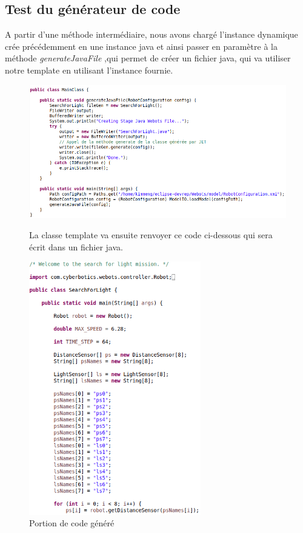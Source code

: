 \documentclass[a4paper,12pt]{article}
\begin{document}
\subsection{Test du générateur de code}
A partir d'une méthode intermédiaire, nous avons chargé l'instance dynamique crée précédemment en une instance java et ainsi passer en paramètre à la méthode \textit{generateJavaFile} 
,qui permet de créer un fichier java, qui va utiliser notre template en utilisant l'instance fournie. 
\begin{figure}[!h]  
    \includegraphics[width=14cm]{main.png}
    \begin{flushleft}
    La classe template va ensuite renvoyer ce code ci-dessous qui sera écrit dans un fichier java.
    \end{flushleft}
    \includegraphics[width=7.5cm]{code_gen.png}
    \caption{Portion de code généré}
\end{figure}
\end{document}
